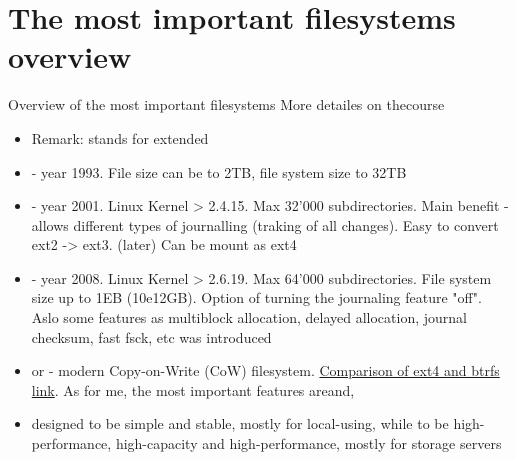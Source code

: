 \documentclass[usenames,dvipsnames,10pt,aspectratio=169]{beamer}
\begin{document}

\section{The most important filesystems overview}
\begin{frame}{Overview of the most important filesystems}
    More detailes on thecourse
    \begin{itemize}
        \item Remark:  stands for extended
        \item {} - year 1993. File size can be to 2TB, file system size to 32TB
        \item {} - year 2001. Linux Kernel > 2.4.15. Max 32'000 subdirectories. Main benefit - allows different types of journalling (traking of all changes). Easy to convert ext2 -> ext3. (later) Can be mount as ext4
        \item {} - year 2008. Linux Kernel > 2.6.19. Max 64'000 subdirectories. File system size up to 1EB (10e12GB). Option of turning the journaling feature "off". Aslo some features as multiblock allocation, delayed allocation, journal checksum, fast fsck, etc was introduced
        \item {}or - modern Copy-on-Write (CoW) filesystem. \href{https://linuxhint.com/btrfs-vs-ext4-filesystems-comparison/}{Comparison of ext4 and btrfs link}. As for me, the most important features areand,
        \item {} designed to be simple and stable, mostly for local-using, while  to be high-performance, high-capacity and high-performance, mostly for storage servers
    \end{itemize}
\end{frame}
\end{document}
